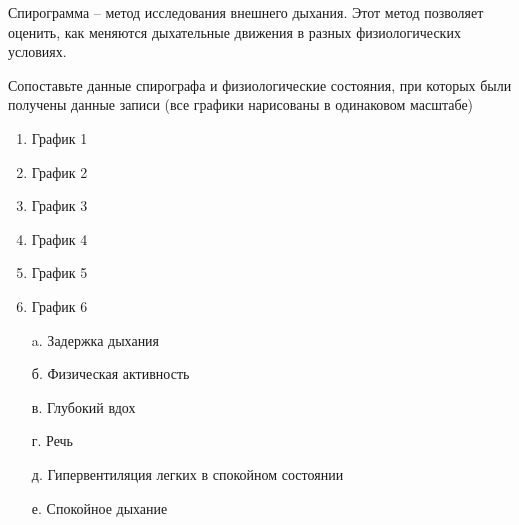 
Спирограмма – метод исследования внешнего дыхания. Этот
метод позволяет оценить, как меняются дыхательные движения в разных
физиологических условиях.


Сопоставьте данные спирографа и физиологические состояния, при которых были получены данные записи (все графики нарисованы в одинаковом масштабе)

\begin{multicols}{2}
{
\begin{enumerate}
    \item График 1 
    \item График 2
    \item График 3
    \item График 4
    \item График 5
    \item График 6
\end{enumerate}
}
{
    \begin{enumerate}
        \item[a.] Задержка дыхания
        \item[б.] Физическая активность
        \item[в.] Глубокий вдох
        \item[г.] Речь
        \item[д.] Гипервентиляция легких в спокойном состоянии
        \item[е.] Спокойное дыхание     
    \end{enumerate}
}

\end{multicols}



